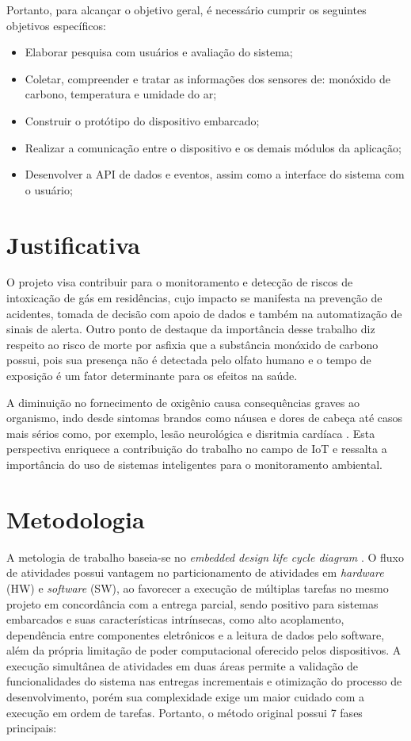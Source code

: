 Portanto, para alcançar o objetivo geral, é necessário cumprir os seguintes objetivos específicos:
\begin{itemize}
    \item Elaborar pesquisa com usuários e avaliação do sistema;
    \item Coletar, compreender e tratar as informações dos sensores de: monóxido de carbono, temperatura e umidade do ar;
    \item Construir o protótipo do dispositivo embarcado;
    \item Realizar a comunicação entre o dispositivo e os demais módulos da aplicação;
    \item Desenvolver a API de dados e eventos, assim como a interface do sistema com o usuário;
\end{itemize}

\section{Justificativa}

O projeto visa contribuir para o monitoramento e detecção de riscos de intoxicação de gás em residências, cujo 
impacto se manifesta na prevenção de acidentes, tomada de decisão com apoio de dados e também na automatização 
de sinais de alerta. Outro ponto de destaque da importância desse trabalho diz respeito ao risco de morte por asfixia 
que a substância monóxido de carbono possui, pois sua presença não é detectada pelo olfato humano e o tempo de exposição é um 
fator determinante para os efeitos na saúde. 

A diminuição no fornecimento de oxigênio causa consequências graves ao organismo, indo desde sintomas brandos como náusea e dores de 
cabeça até casos mais sérios como, por exemplo, lesão neurológica e disritmia cardíaca \cite{carbon-monoxide-poisoning-varon}. Esta perspectiva enriquece a 
contribuição do trabalho no campo de IoT e ressalta a importância do uso de sistemas inteligentes para o monitoramento ambiental.  

\section{Metodologia}

A metologia de trabalho baseia-se no \textit{embedded design life cycle diagram} \cite{system-design-IOT}. O fluxo de atividades possui vantagem no 
particionamento de atividades em \textit{hardware} (HW) e \textit{software} (SW), ao favorecer 
a execução de  múltiplas tarefas no mesmo projeto em concordância com a entrega parcial, sendo positivo para sistemas embarcados e 
suas características intrínsecas, como alto acoplamento, dependência entre componentes eletrônicos e a leitura de dados pelo software, além da própria limitação de 
poder computacional oferecido pelos dispositivos. A execução simultânea de atividades em 
duas áreas permite a validação de funcionalidades do sistema nas entregas incrementais e otimização do 
processo de desenvolvimento, porém sua complexidade exige um maior cuidado com a execução em ordem de tarefas. Portanto, o método original possui 7 fases principais:  

